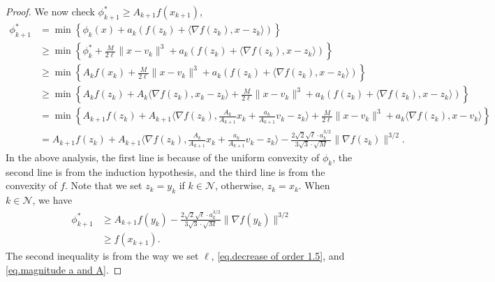 \documentclass{article}
\begin{document}
\begin{proof}
We now check $\phi_{k+1}^* \geq A_{k+1}f(x_{k+1})$,
\begin{equation*}
    \begin{aligned}
        \phi_{k+1}^* &= \min \left \{ \phi_k(x)+a_k \left (f(z_k)+\langle \nabla f(z_k),x-z_k\rangle \right)\right \}\\
        &\geq \min \left \{ \phi_k^* +\frac{M}{2\ell}\|x-v_k\|^3+a_k \left (f(z_k)+\langle \nabla f(z_k),x-z_k\rangle \right)\right \}\\
        &\geq \min \left \{ A_k f(x_k) +\frac{M}{2\ell}\|x-v_k\|^3+a_k \left (f(z_k)+\langle \nabla f(z_k),x-z_k\rangle \right)\right \}\\
        &\geq \min \left \{ A_k f(z_k) +A_k \langle \nabla f(z_k),x_k-z_k\rangle +\frac{M}{2\ell}\|x-v_k\|^3+a_k \left (f(z_k)+\langle \nabla f(z_k),x-z_k\rangle \right)\right \}\\
        &= \min \left \{ A_{k+1} f(z_k)+A_{k+1} \langle \nabla f(z_k),\frac{A_k}{A_{k+1}}x_k+\frac{a_k}{A_{k+1}}v_k-z_k\rangle +\frac{M}{2\ell}\|x-v_k\|^3+a_k\langle \nabla f(z_k),x-v_k\rangle\right \}\\
        &= A_{k+1} f(z_k)+A_{k+1} \langle \nabla f(z_k),\frac{A_k}{A_{k+1}}x_k+\frac{a_k}{A_{k+1}}v_k-z_k\rangle-\frac{2\sqrt{2}\sqrt{\ell}\cdot a_k^{3/2}}{3\sqrt{3}\cdot\sqrt{M}}\|\nabla f(z_k)\|^{3/2}.
    \end{aligned}
\end{equation*}
In the above analysis, the first line is because of the uniform convexity of $\phi_k$, the second line is from the induction hypothesis, and the third line is from the convexity of $f$. Note that we set $z_k = y_k$ if $k\in \mathcal{N}$, otherwise, $z_k=x_k$. When $k\in \mathcal{N}$, we have
\begin{equation*}
\begin{aligned}
    \phi_{k+1}^* &\geq A_{k+1}f(y_k)-\frac{2\sqrt{2}\sqrt{\ell}\cdot a_k^{3/2}}{3\sqrt{3}\cdot\sqrt{M}}\|\nabla f(y_k)\|^{3/2}\\
    &\geq f(x_{k+1}).
\end{aligned}
\end{equation*}
The second inequality is from the way we set $\ell$, \eqref{eq.decrease of order 1.5}, and \eqref{eq.magnitude a and A}. 


\end{proof}
\end{document}
